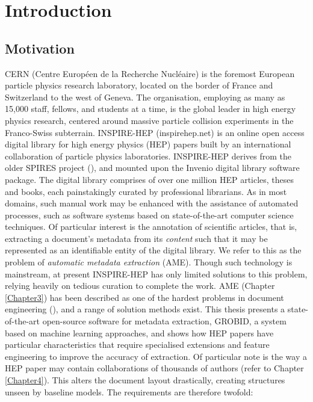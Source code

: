 
\chapter{Introduction} %

\label{Chapter1} %



\section{Motivation}

CERN (Centre Europ\'een de la Recherche Nucl\'eaire) is the foremost European particle physics research laboratory, located on the border of France and Switzerland to the west of Geneva. The organisation, employing as many as 15,000 staff, fellows, and students at a time, is the global leader in high energy physics research, centered around massive particle collision experiments in the Franco-Swiss subterrain. INSPIRE-HEP (inspirehep.net) is an online open access digital library for high energy physics (HEP) papers built by an international collaboration of particle physics laboratories. INSPIRE-HEP derives from the older SPIRES project (\cite{gentil2009information}), and mounted upon the Invenio digital library software package. The digital library comprises of over one million HEP articles, theses and books, each painstakingly curated by professional librarians. As in most domains, such manual work may be enhanced with the assistance of automated processes, such as software systems based on state-of-the-art computer science techniques. Of particular interest is the annotation of scientific articles, that is, extracting a document's metadata from its \emph{content} such that it may be represented as an identifiable entity of the digital library. We refer to this as the problem of \emph{automatic metadata extraction} (AME). Though such technology is mainstream, at present INSPIRE-HEP has only limited solutions to this problem, relying heavily on tedious curation to complete the work. AME (Chapter \ref{Chapter3}) has been described as one of the hardest problems in document engineering (\cite{souza2014arctic}), and a range of solution methods exist. This thesis presents a state-of-the-art open-source software for metadata extraction, GROBID, a system based on machine learning approaches, and shows how HEP papers have particular characteristics that require specialised extensions and feature engineering to improve the accuracy of extraction. Of particular note is the way a HEP paper may contain collaborations of thousands of authors (refer to Chapter \ref{Chapter4}). This alters the document layout drastically, creating structures unseen by baseline models. The requirements are therefore twofold:

